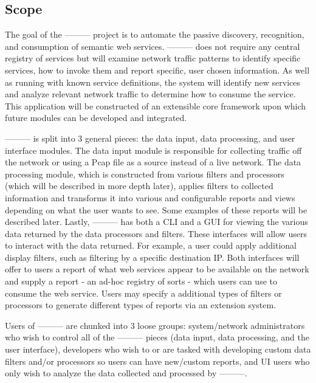 \documentclass[titlepage]{article}
\begin{document}

\subsection{Scope%
  \label{scope}%
}

The goal of the --------- project is to automate the passive discovery,
recognition, and consumption of semantic web services.  --------- does not
require any central registry of services but will examine network traffic
patterns to identify specific services, how to invoke them and report
specific, user chosen information.  As well as running with known service
definitions, the system will identify new services and analyze
relevant network traffic to determine how to consume the service.  This
application will be constructed of an extensible core framework upon which
future modules can be developed and integrated.

--------- is split into 3 general pieces: the data input, data processing,
and user interface modules.  The data input module is responsible for
collecting traffic off the network or using a Pcap file as a source instead of
a live network.  The data processing module, which is constructed from various
filters and processors (which will be described in more depth later), applies
filters to collected information and transforms it into
various and configurable reports and views depending on what the user wants to
see.  Some examples of these reports will be described later.  Lastly,
--------- has both a CLI and a GUI for viewing the various data returned
by the data processors and filters.  These interfaces will allow users to
interact with the data returned.  For example, a user could apply additional
display filters, such as filtering by a specific destination IP.  Both
interfaces will offer to users a report of what web services appear to be
available on the network and supply a report - an ad-hoc registry of sorts -
which users can use to consume the web service.  Users may specify a additional
types of filters or processors to generate different types of reports via an
extension system.

Users of --------- are chunked into 3 loose groups: system/network
administrators who wish to control all of the --------- pieces (data
input, data processing, and the user interface), developers who wish to or are
tasked with developing custom data filters and/or processors so users can have
new/custom reports, and UI users who only wish to analyze the data collected
and processed by ---------.
\end{document}
